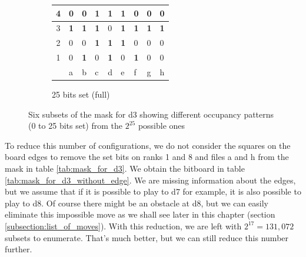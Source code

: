 \documentclass[12pt,a4paper,twoside,openright]{book}
\begin{document}
\begin{figure}[htpb]
\begin{subfigure}[b]{0.45\textwidth}
\begin{tabular}{|c|*{8}{>{\centering\arraybackslash}p{0.3cm}|}}
{\scriptsize 4} & \tiny 0 & \tiny 0 & \tiny\textbf{1} & \tiny\textbf{1} & \tiny\textbf{1} & \tiny 0 & \tiny 0 & \tiny 0 \\[2pt] \hline
{\scriptsize 3} & \tiny\textbf{1} & \tiny\textbf{1} & \tiny\textbf{1} & \cellcolor{lightgray}\tiny 0 & \tiny\textbf{1} & \tiny\textbf{1} & \tiny\textbf{1} & \tiny\textbf{1} \\[2pt] \hline
{\scriptsize 2} & \tiny 0 & \tiny 0 & \tiny\textbf{1} & \tiny\textbf{1} & \tiny\textbf{1} & \tiny 0 & \tiny 0 & \tiny 0 \\[2pt] \hline
{\scriptsize 1} & \tiny 0 & \tiny\textbf{1} & \tiny 0 & \tiny\textbf{1} & \tiny 0 & \tiny\textbf{1} & \tiny 0 & \tiny 0 \\[2pt] \hline
\multicolumn{1}{c|}{} & \scriptsize a & \scriptsize b & \scriptsize c & \scriptsize d & \scriptsize e & \scriptsize f & \scriptsize g & \scriptsize h \\
\cline{2-9}
\end{tabular}
\caption{25 bits set (full)}
\end{subfigure}

\caption{Six subsets of the mask for d3 showing different occupancy patterns (0 to 25 bits set) from the $2^{25}$ possible ones}
\label{fig:subsets_for_d3}
\end{figure}
 
\label{par:edge_exclusion}
To reduce this number of configurations, we do not consider the squares on the board edges to remove the set bits on ranks 1 and 8 and files a and h from the mask in table \ref{tab:mask_for_d3}. We obtain the bitboard in table \ref{tab:mask_for_d3_without_edge}. We are missing information about the edges, but we assume that if it is possible to play to {\ttfamily d7} for example, it is also possible to play to {\ttfamily d8}. Of course there might be an obstacle at {\ttfamily d8}, but we can easily eliminate this impossible move as we shall see later in this chapter (section \ref{subsection:list_of_moves}). With this reduction, we are left with $2^{17} = 131,072$ subsets to enumerate. That's much better, but we can still reduce this number further.\\
\end{document}

